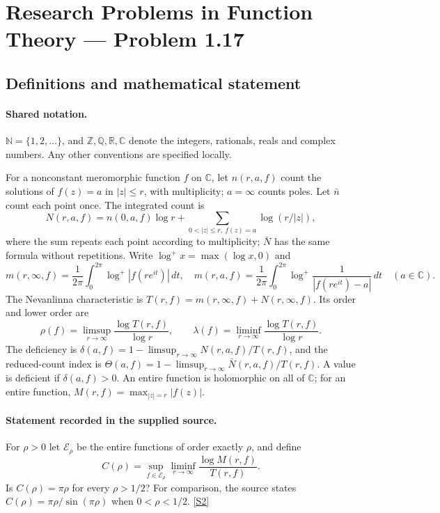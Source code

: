 \documentclass[11pt]{article}
\newcommand{\sref}[2]{\hyperlink{source:#1:#2}{[S#2]}}
\begin{document}
\section{Research Problems in Function Theory — Problem 1.17}\label{statement}

\subsection{Definitions and mathematical statement}

\paragraph{Shared notation.}$\mathbb N=\{1,2,\ldots\}$, and $\mathbb Z,\mathbb Q,\mathbb R,\mathbb C$ denote the integers, rationals, reals and complex numbers. Any other conventions are specified locally.


For a nonconstant meromorphic function $f$ on $\mathbb C$, let $n(r,a,f)$ count the solutions of $f(z)=a$ in $|z|\le r$, with multiplicity; $a=\infty$ counts poles. Let $\bar n$ count each point once. The integrated count is
\[
 N(r,a,f)=n(0,a,f)\log r+\sum_{0<|z|\le r,\ f(z)=a}\log(r/|z|),
\]
where the sum repeats each point according to multiplicity; $\bar N$ has the same formula without repetitions. Write $\log^+x=\max(\log x,0)$ and
\[
 m(r,\infty,f)=\frac1{2\pi}\int_0^{2\pi}\log^+|f(re^{it})|\,dt,\quad
 m(r,a,f)=\frac1{2\pi}\int_0^{2\pi}\log^+\frac1{|f(re^{it})-a|}\,dt\quad(a\in\mathbb C).
\]
The Nevanlinna characteristic is $T(r,f)=m(r,\infty,f)+N(r,\infty,f)$. Its order and lower order are
\[
 \rho(f)=\limsup_{r\to\infty}\frac{\log T(r,f)}{\log r},\qquad
 \lambda(f)=\liminf_{r\to\infty}\frac{\log T(r,f)}{\log r}.
\]
The deficiency is $\delta(a,f)=1-\limsup_{r\to\infty}N(r,a,f)/T(r,f)$, and the reduced-count index is $\Theta(a,f)=1-\limsup_{r\to\infty}\bar N(r,a,f)/T(r,f)$. A value is deficient if $\delta(a,f)>0$. An entire function is holomorphic on all of $\mathbb C$; for an entire function, $M(r,f)=\max_{|z|=r}|f(z)|$.
\paragraph{Statement recorded in the supplied source.}
For $\rho>0$ let $\mathcal E_\rho$ be the entire functions of order exactly $\rho$, and define
\[
 C(\rho)=\sup_{f\in\mathcal E_\rho}\liminf_{r\to\infty}\frac{\log M(r,f)}{T(r,f)}.
\]
Is $C(\rho)=\pi\rho$ for every $\rho>1/2$? For comparison, the source states $C(\rho)=\pi\rho/\sin(\pi\rho)$ when $0<\rho<1/2$. \sref{statement}{2}
\end{document}
